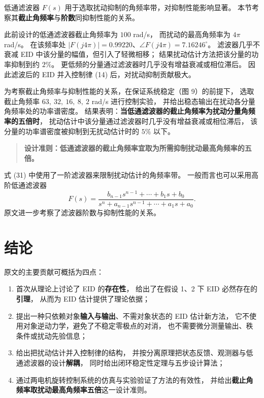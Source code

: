 \documentclass[11pt,a4paper]{ctexart}
\begin{document}
低通滤波器 $F(s)$ 用于选取扰动抑制的角频率带，对抑制性能影响显著。
本节考察其\textbf{截止角频率}与\textbf{阶数}同抑制性能的关系。

此前设计的低通滤波器截止角频率为 $100$ rad/s，
而扰动的最高角频率为 $4\pi$ rad/s。
在该频率处 $|F(j4\pi)|=0.99220$、$\angle F(j4\pi)=7.16246^{\circ}$。
滤波器几乎不衰减 EID 中该分量的幅值，但引入了轻微相移；
结果扰动估计方法把该分量的功率抑制到约 $2\%$。
更低频的分量通过滤波器时几乎没有增益衰减或相位滞后。
因此滤波后的 EID 并入控制律 (14) 后，对扰动抑制贡献极大。

为考察截止角频率与抑制性能的关系，在保证系统稳定（图 9）的前提下，
选取截止角频率 $63,\ 32,\ 16,\ 8,\ 2$ rad/s 进行控制实验，
并给出稳态输出在扰动各分量角频率处的功率谱密度。
结果表明：\textbf{当低通滤波器的截止角频率为扰动分量角频率的五倍时}，
扰动估计中该分量通过滤波器时几乎没有增益衰减或相位滞后，
该分量的功率谱密度被抑制到无扰动估计时的 $5\%$ 以下。

\begin{quote}
\bfseries 设计准则：低通滤波器的截止角频率宜取为所需抑制扰动最高角频率的五倍。
\end{quote}

式 (31) 中使用了一阶滤波器来限制扰动估计的角频率带。
一般而言也可以采用高阶低通滤波器
\begin{equation}
F(s)=\frac{b_{n-1}s^{n-1}+\cdots+b_1 s+b_0}{s^{n}+a_{n-1}s^{n-1}+\cdots+a_1 s+a_0}.
\end{equation}
原文进一步考察了滤波器阶数与抑制性能的关系。

\section{结论}

原文的主要贡献可概括为四点：
\begin{enumerate}[label=(\arabic*)]
\item 首次从理论上讨论了 EID 的\textbf{存在性}，
给出了在假设 1、2 下 EID 必然存在的\textbf{引理}，
从而为 EID 估计提供了理论依据；
\item 提出一种只依赖对象\textbf{输入与输出}、不需对象状态的 EID 估计新方法，
它不使用对象逆动力学，避免了不稳定零极点的对消，
也不需要微分测量输出、秩条件或扰动先验信息；
\item 给出把扰动估计并入控制律的结构，
并按分离原理把状态反馈、观测器与低通滤波器的设计\textbf{解耦}，
同时给出闭环稳定性定理与五步设计算法；
\item 通过两电机旋转控制系统的仿真与实验验证了方法的有效性，
并给出\textbf{截止角频率取扰动最高角频率五倍}这一设计准则。
\end{enumerate}
\end{document}
